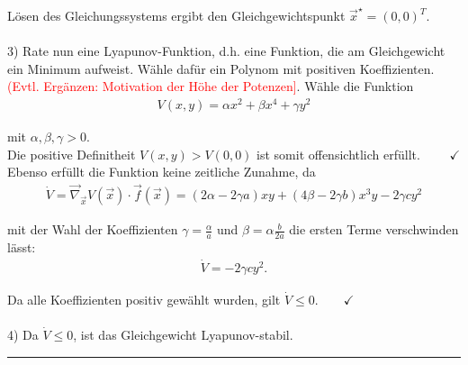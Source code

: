 \documentclass{article}
\begin{document}
{	Lösen des Gleichungssystems ergibt den Gleichgewichtspunkt $\vec{x}^\star = (0,0)^T$.\\
	\\
	3) Rate nun eine Lyapunov-Funktion, d.h. eine Funktion, die am Gleichgewicht ein Minimum aufweist. Wähle dafür ein Polynom mit positiven Koeffizienten. \textcolor{red}{(Evtl. Ergänzen: Motivation der Höhe der Potenzen]}. Wähle die Funktion
		\begin{align*}
			V(x,y) = \alpha x^2 + \beta x^4 + \gamma y^2
		\end{align*}
	
	mit $\alpha, \beta, \gamma > 0$.\\
	Die positive Definitheit $V(x,y) > V(0,0)$ ist somit offensichtlich erfüllt. $\qquad \checkmark$\\
	Ebenso erfüllt die Funktion keine zeitliche Zunahme, da
		\begin{align*}
			\dot{V} = \vec{\nabla}_{\vec{x}} V(\vec{x}) \cdot \vec{f}(\vec{x}) = (2\alpha - 2\gamma a) x y + (4\beta - 2\gamma b) x^3 y - 2\gamma c y^2
		\end{align*}
	
	mit der Wahl der Koeffizienten $\gamma = \frac{\alpha}{a}$ und $\beta = \alpha \frac{b}{2a}$ die ersten Terme verschwinden lässt:
		\begin{align*}
			\dot{V} = - 2\gamma c y^2.
		\end{align*}
	
	Da alle Koeffizienten positiv gewählt wurden, gilt $\dot{V} \leq 0. \qquad \checkmark$\\
	\\
	4) Da $\dot{V} \leq 0$, ist das Gleichgewicht Lyapunov-stabil.
\hrule
}


\newpage
\end{document}
